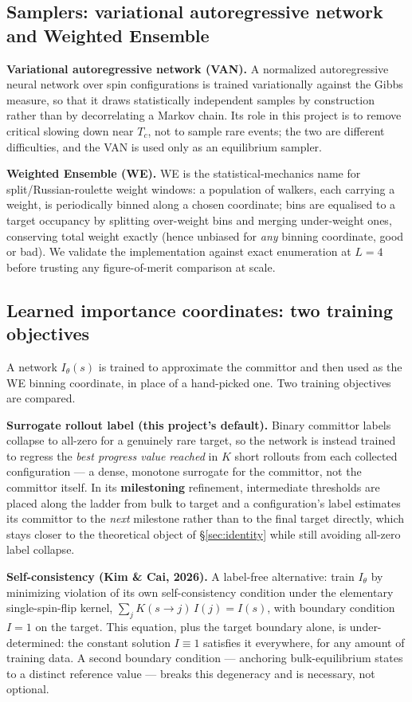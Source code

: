 \documentclass[a4paper,fleqn]{cas-sc}
\begin{document}
	\subsection{Samplers: variational autoregressive network and Weighted Ensemble}\label{sec:samplers}
	\textbf{Variational autoregressive network (VAN).} A normalized autoregressive neural network
	over spin configurations is trained variationally against the Gibbs measure, so that it draws
	statistically independent samples by construction rather than by decorrelating a Markov chain.
	Its role in this project is to remove critical slowing down near $T_c$, not to sample rare
	events; the two are different difficulties, and the VAN is used only as an equilibrium
	sampler.
	
	\textbf{Weighted Ensemble (WE).} WE is the statistical-mechanics name for split/Russian-roulette weight
	windows: a population of walkers, each carrying a weight, is periodically binned along a
	chosen coordinate; bins are equalised to a target occupancy by splitting
	over-weight bins and merging under-weight ones, conserving total weight exactly (hence unbiased for
	\emph{any} binning coordinate, good or bad). We validate the implementation against exact
	enumeration at $L=4$ before trusting any figure-of-merit comparison at scale.
	
	\subsection{Learned importance coordinates: two training objectives}\label{sec:objectives}
	A network $I_\theta(s)$ is trained to approximate the committor and then used as the WE
	binning coordinate, in place of a hand-picked one. Two training objectives are compared.
	
	\textbf{Surrogate rollout label (this project's default).} Binary committor labels collapse
	to all-zero for a genuinely rare target, so the network is instead trained to regress the
	\emph{best progress value reached} in $K$ short rollouts from each collected configuration
	--- a dense, monotone surrogate for the committor, not the committor itself. In its
	\textbf{milestoning} refinement, intermediate thresholds are placed along the ladder from
	bulk to target and a configuration's label estimates its committor to the \emph{next}
	milestone rather than to the final target directly, which stays closer to the theoretical
	object of \S\ref{sec:identity} while still avoiding all-zero label collapse.
	
	\textbf{Self-consistency (Kim \& Cai, 2026).} A label-free alternative: train $I_\theta$ by
	minimizing violation of its own self-consistency condition under the elementary
	single-spin-flip kernel, $\sum_j K(s\to j)\,I(j)=I(s)$, with boundary condition $I=1$ on the
	target. This equation, plus the target boundary alone, is under-determined: the constant
	solution $I\equiv1$ satisfies it everywhere, for any amount of training data. A second
	boundary condition --- anchoring bulk-equilibrium states to a distinct reference value ---
	breaks this degeneracy and is necessary, not optional.
	
\end{document}

